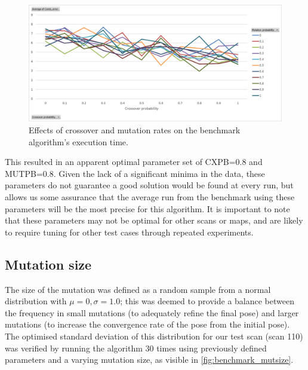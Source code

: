 \documentclass[authoryearcitations]{UoYCSproject}
\begin{document}
\begin{figure}[H]
\centering
	\includegraphics[width=\textwidth,keepaspectratio]{images/ga_cxpb_mutpb.png}
	\caption[Optimising crossover and mutation rate for benchmark algorithm.]{Effects of crossover and mutation rates on the benchmark algorithm's execution time.}
	\label{fig:ga_cxpb_mutpb}
\end{figure}

 This resulted in an apparent optimal parameter set of CXPB=0.8 and MUTPB=0.8. Given the lack of a significant minima in the data, these parameters do not guarantee a good solution would be found at every run, but allows us some assurance that the average run from the benchmark using these parameters will be the most precise for this algorithm. It is important to note that these parameters may not be optimal for other scans or maps, and are likely to require tuning for other test cases through repeated experiments. 

\subsection{Mutation size}

The size of the mutation was defined as a random sample from a normal distribution with $\mu=0, \sigma=1.0$; this was deemed to provide a balance between the frequency in small mutations (to adequately refine the final pose) and larger mutations (to increase the convergence rate of the pose from the initial pose). The optimised standard deviation of this distribution for our test scan (scan 110) was verified by running the algorithm 30 times using previously defined parameters and a varying mutation size, as visible in \autoref{fig:benchmark_mutsize}.

\datatablebenchmarkmutsize
\end{document}
